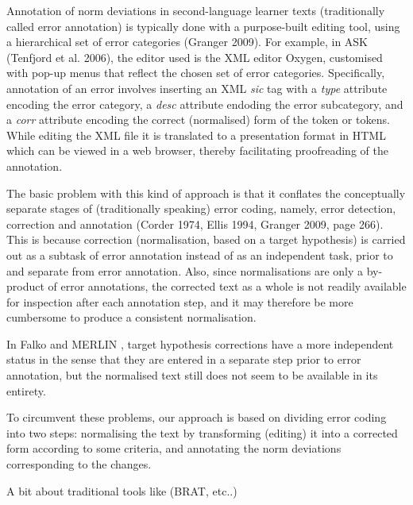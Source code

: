 \documentclass[10pt, a4paper]{article}
\begin{document}

Annotation of norm deviations in second-language learner texts (traditionally
called error annotation) is typically done with a purpose-built editing tool,
using a hierarchical set of error categories (Granger 2009). For example,
in ASK (Tenfjord et al. 2006), the editor used is the XML editor Oxygen,
customised with pop-up menus that reflect the chosen set of error
categories. Specifically, annotation of an error involves inserting an XML
{\em sic} tag with a {\em type} attribute encoding the error category, a {\em
desc} attribute endoding the error subcategory, and a {\em corr} attribute
encoding the correct (normalised) form of the token or tokens.
While editing the XML file it is translated to a presentation format in HTML
which can be viewed in a web browser, thereby facilitating proofreading of
the annotation.

The basic problem with this kind of approach is that it conflates the conceptually separate stages of (traditionally speaking) error coding, namely, error detection, correction and annotation (Corder 1974, Ellis 1994, Granger 2009, page 266). This is because correction (normalisation, based on a target hypothesis) is carried out as a subtask of error annotation instead of as an independent task, prior to and separate from error annotation. Also, since normalisations are only a by-product of error annotations, the corrected text as a whole is not readily available for inspection after each annotation step, and it may therefore be more cumbersome to produce a consistent normalisation.

In Falko \cite{ludeling05multi-levelerror} and MERLIN  \cite{MERLIN2014},
target hypothesis corrections have a more independent status in the sense that they are entered in a separate step prior to error annotation, but the normalised text still does not seem to be available in its entirety.

To circumvent these problems, our approach is based on dividing error coding into two steps: normalising the text by transforming (editing) it into a corrected form according to some criteria, and annotating the norm deviations corresponding to the changes.



A bit about traditional tools like   (BRAT, etc..)
\end{document}
